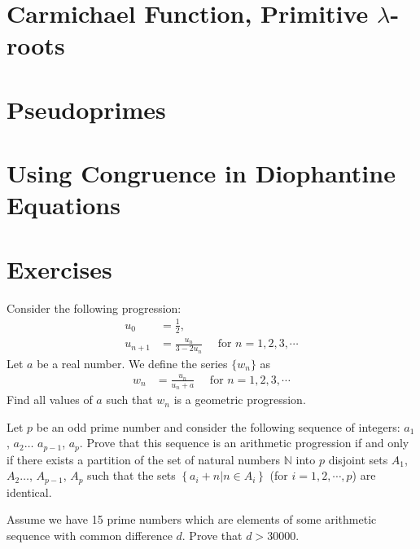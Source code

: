 \documentclass{subfile}
\begin{document}
	\section{Carmichael Function, Primitive $\lambda$-roots}
		
	\section{Pseudoprimes} \label{sec:pseudoprimes}
		
	\section{Using Congruence in Diophantine Equations}
		

		\newpage	
		\section{Exercises}
	
	\begin{problem} %
		Consider the following progression:
		\begin{align*}
		u_0 &= \frac{1}{2},\\
		u_{n+1} &= \frac{u_n}{3-2u_n} \quad \text{ for } n=1,2,3,\cdots
		\end{align*}
		Let $a$ be a real number. We define the series $\{w_n\}$ as
		\begin{align*}
		w_n &= \frac{u_n}{u_n + a} \quad \text{ for } n=1,2,3,\cdots
		\end{align*}
		Find all values of $a$ such that $w_n$ is a geometric progression.
	\end{problem}		
	
	\begin{problem} %
		Let $p$ be an odd prime number and consider the following sequence of integers: $a_1$, $a_2\ldots$ $a_{p-1}$, $a_p$. Prove that this sequence is an arithmetic progression if and only if there exists a partition of the set of natural numbers $\mathbb{N}$ into $p$ disjoint sets $A_1$, $A_2\ldots$, $A_{p-1}$, $A_p$ such that the sets $\left\{ a_i+n|n\in A_i\right\}$ (for $i=1, 2,\cdots, p$) are identical.
	\end{problem}
	
	\begin{problem} %
		Assume we have 15 prime numbers which are elements of some arithmetic sequence with common difference $d$. Prove that $d>30000$.
	\end{problem}
	
\end{document}
